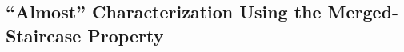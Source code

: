 \documentclass[11pt]{article}
\newtheorem{inftheorem}{Theorem (Informal)}[section]
\newcommand{\nfeats}{d}
\newcommand{\kb}[1]{{\color{purple}[KB: #1]}}
\begin{document}








\subsection{``Almost'' Characterization Using the Merged-Staircase Property}
\end{document}
